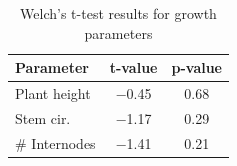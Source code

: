\begin{table}[htbp]
    \caption{Welch's t-test results for growth parameters}
    \label{tab:ttest_results}
    \begin{tabularx}{\linewidth}{lcc}
        \toprule
        \textbf{Parameter} & \textbf{t-value} & \textbf{p-value} \\
        \midrule
        Plant height & \num[mode=text]{-0.45} & \num[mode=text]{0.68} \\
        Stem cir. & \num[mode=text]{-1.17} & \num[mode=text]{0.29} \\
        \# Internodes & \num[mode=text]{-1.41} & \num[mode=text]{0.21} \\
        \bottomrule
    \end{tabularx}
\end{table}